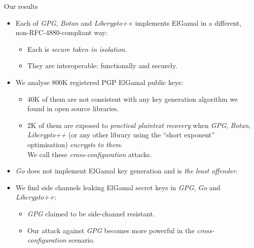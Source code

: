 \documentclass[aspectratio=169]{beamer}
\begin{document}
\begin{frame}{Our results}
  \begin{itemize}
    \setlength{\itemsep}{1em}
  \item<1-> Each of \emph{GPG}, \emph{Botan} and \emph{Libcrypto++}
    implements ElGamal in a different, non-RFC-4880-compliant way:
    \begin{itemize}
    \item Each is \emph{secure taken in isolation}.
    \item They are interoperable: functionally and securely.
    \end{itemize}
  \item<3-> We analyse 800K registered PGP ElGamal public keys:
    \begin{itemize}
    \item 40K of them are not consistent with any key
      generation algorithm we found in open source libraries.
    \item 2K of them are exposed to \emph{practical plaintext
        recovery} when \emph{GPG}, \emph{Botan}, \emph{Libcrypto++}
      (or any other library using the ``short exponent'' optimisation)
      \emph{encrypts to them}.\\
      We call these \emph{cross-configuration} attacks.
    \end{itemize}
  \item<2-> \emph{Go} does not implement ElGamal key generation and is \emph{the
    least offender}.
  \item<4-> We find side channels leaking ElGamal secret keys in \emph{GPG}, \emph{Go} and
    \emph{Libcrypto++}:
    \begin{itemize}
    \item \emph{GPG} claimed to be side-channel resistant.
    \item Our attack against \emph{GPG} becomes more powerful in the
      \emph{cross-configuration} scenario.
    \end{itemize}
  \end{itemize}
\end{frame}

\end{document}

